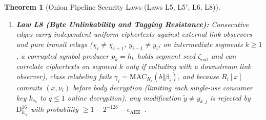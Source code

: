 \documentclass[journal]{IEEEtran}
\newtheorem{theorem}{Theorem}
\begin{document}
\begin{theorem}[Onion Pipeline Security Laws (Laws L5, L5$'$, L6, L8)]
\begin{enumerate}[leftmargin=1.5em]
\item \textbf{Law L8 (Byte Unlinkability and Tagging Resistance):} Consecutive edges carry independent uniform ciphertexts against external link observers and pure transit relays ($\chi_i\neq\chi_{i+1}$, $y_{i-1}\neq y_i$; on intermediate segments $k\ge 1$, a corrupted symbol producer $p_k=h_k$ holds segment seed $\zeta_{\mathrm{out}}$ and can correlate ciphertexts on segment $k$ only if colluding with a downstream link observer), class relabeling fails $\gamma_i=\mathrm{MAC}_{K_i}(b\Vert\beta_i)$, and because $R_i[x]$ commits $(x,\nu_i)$ before body decryption (limiting each single-use consumer key $k_{c_k}$ to $q\le 1$ online decryption), any modification $\tilde{y}\neq y_{k,j}$ is rejected by $\mathrm{D}^{16}_{k_{c_k}}$ with probability $\ge 1-2^{-128}-\epsilon_{\mathrm{AEZ}}$~\cite{Degabriele2018}.
\end{enumerate}
\end{theorem}
\end{document}
